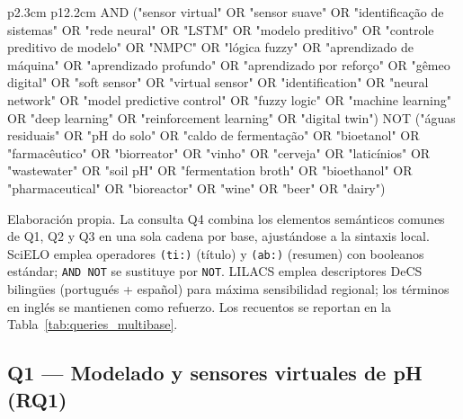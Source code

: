 \begin{table}[H]
\begin{tabular}{p{2.3cm} p{12.2cm}}
{     AND ("sensor virtual" OR "sensor suave" OR "identificação de
     sistemas" OR "rede neural" OR "LSTM" OR "modelo preditivo" OR
     "controle preditivo de modelo" OR "NMPC" OR "lógica fuzzy" OR
     "aprendizado de máquina" OR "aprendizado profundo" OR
     "aprendizado por reforço" OR "gêmeo digital" OR "soft sensor"
     OR "virtual sensor" OR "identification" OR "neural network" OR
     "model predictive control" OR "fuzzy logic" OR "machine learning"
     OR "deep learning" OR "reinforcement learning" OR "digital twin")
     NOT ("águas residuais" OR "pH do solo" OR "caldo de fermentação"
     OR "bioetanol" OR "farmacêutico" OR "biorreator" OR "vinho" OR
     "cerveja" OR "laticínios" OR "wastewater" OR "soil pH" OR
     "fermentation broth" OR "bioethanol" OR "pharmaceutical" OR
     "bioreactor" OR "wine" OR "beer" OR "dairy")} \\
\bottomrule
\end{tabular}
\begin{Nota}[Nota]{\linewidth}{Elaboración propia. La consulta Q4
combina los elementos semánticos comunes de Q1, Q2 y Q3 en una sola
cadena por base, ajustándose a la sintaxis local. SciELO emplea operadores
\texttt{(ti:)} (título) y \texttt{(ab:)} (resumen) con booleanos estándar;
\texttt{AND NOT} se sustituye por \texttt{NOT}. LILACS emplea descriptores
DeCS bilingües (portugués + español) para máxima sensibilidad regional;
los términos en inglés se mantienen como refuerzo. Los recuentos se
reportan en la Tabla~\ref{tab:queries_multibase}.}
\end{Nota}
\end{table}

\newpage

\subsection*{Q1 --- Modelado y sensores virtuales de pH (RQ1)}

